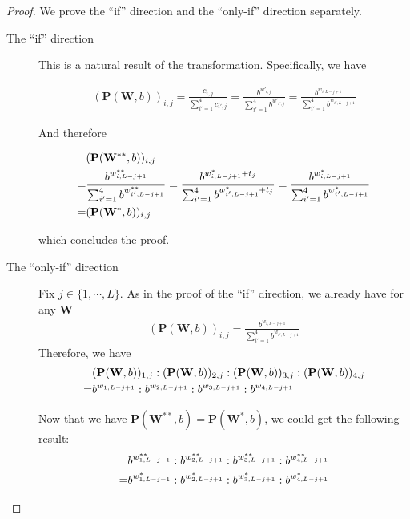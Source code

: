 \documentclass[12pt]{article}
\newcommand{\matrixSymbol}[1]{\mathbf{#1}}
\begin{document}
\begin{proof}

We prove the ``if'' direction and the ``only-if'' direction separately.

\begin{description}
\item[The ``if'' direction] This is a natural result of the transformation. Specifically, we have

\begin{align}
 (\matrixSymbol{P}(\matrixSymbol{W}, b))_{i, j}  = \frac{c_{i, j}}{\sum_{i'=1}^{4}{c_{i', j}}} = \frac{b^{w'_{i, j}}}{\sum_{i'=1}^{4}{b^{w'_{i', j}}}} = \frac{b^{w_{i, L-j+1}}}{\sum_{i'=1}^{4}{b^{w_{i', L-j+1}}}}
\end{align}

And therefore

\begin{align}
  & (\matrixSymbol{P}(\matrixSymbol{W}^{**}, b))_{i, j} \notag \\
= & \frac{b^{w^{**}_{i, L-j+1}}}{\sum_{i'=1}^{4}{b^{w^{**}_{i', L-j+1}}}} = \frac{b^{w^{*}_{i, L-j+1} + t_{j}}}{\sum_{i'=1}^{4}{b^{w^{*}_{i', L-j+1} + t_{j}}}} = \frac{b^{w^{*}_{i, L-j+1}}}{\sum_{i'=1}^{4}{b^{w^{*}_{i', L-j+1}}}} \\
= & (\matrixSymbol{P}(\matrixSymbol{W}^{*}, b))_{i, j} \notag
\end{align}

which concludes the proof.

\item[The ``only-if'' direction] Fix $j \in \{1, \cdots, L\}$. As in the proof of the ``if'' direction, we already have for any $\matrixSymbol{W}$
\begin{align}
 (\matrixSymbol{P}(\matrixSymbol{W}, b))_{i, j}  =\frac{b^{w_{i, L-j+1}}}{\sum_{i'=1}^{4}{b^{w_{i', L-j+1}}}}
\end{align}
Therefore,  we have
\begin{align}
 &  (\matrixSymbol{P}(\matrixSymbol{W}, b))_{1, j} :   (\matrixSymbol{P}(\matrixSymbol{W}, b))_{2, j} :   (\matrixSymbol{P}(\matrixSymbol{W}, b))_{3, j} :  (\matrixSymbol{P}(\matrixSymbol{W}, b))_{4, j} \notag \\
= & b^{w_{1, L-j+1}} : b^{w_{2, L-j+1}} : b^{w_{3, L-j+1}} : b^{w_{4, L-j+1}} 
\end{align}

Now that we have $\matrixSymbol{P}(\matrixSymbol{W}^{**}, b) = \matrixSymbol{P}(\matrixSymbol{W}^{*}, b)$, we could get the following result:
\begin{align}
 & b^{w^{**}_{1, L-j+1}} : b^{w^{**}_{2, L-j+1}} : b^{w^{**}_{3, L-j+1}} : b^{w^{**}_{4, L-j+1}}  \notag \\
= & b^{w^{*}_{1, L-j+1}} : b^{w^{*}_{2, L-j+1}} : b^{w^{*}_{3, L-j+1}} : b^{w^{*}_{4, L-j+1}} 
\end{align}


\end{description}
\end{proof}
\end{document}
